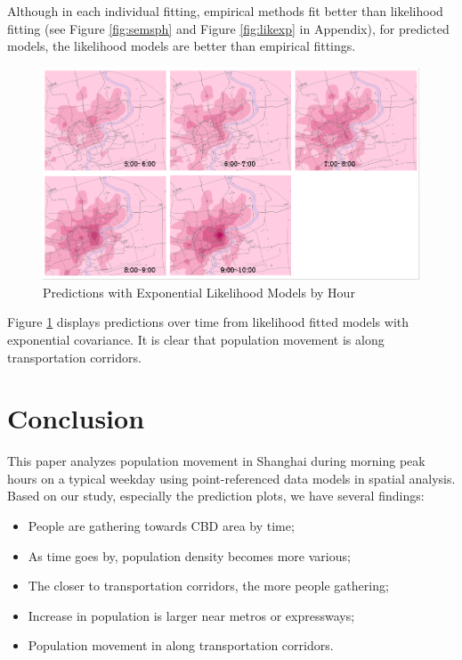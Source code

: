 \documentclass[hidelinks,12pt]{article}
\begin{document}
	 Although in each individual fitting, empirical methods fit better than likelihood fitting (see Figure \ref{fig:semsph} and Figure \ref{fig:likexp} in Appendix), for predicted models, the likelihood models are better than empirical fittings.
	 \begin{figure}[!ht]
	 	\includegraphics[width=\textwidth]{pred_exp.png}
	 	\caption{Predictions with Exponential Likelihood Models by Hour \label{fig:predexp}}
	 \end{figure}
 
	 Figure \ref{fig:predexp} displays predictions over time from likelihood fitted models with exponential covariance. It is clear that population movement is along transportation corridors.

	\section{Conclusion}\label{sec:con}
	This paper analyzes population movement in Shanghai during morning peak hours on a typical weekday using point-referenced data models in spatial analysis. Based on our study, especially the prediction plots, we have several findings:
	\begin{itemize}
		\item People are gathering towards CBD area by time;
		\item As time goes by, population density becomes more various;
		\item The closer to transportation corridors, the more people gathering;
		\item Increase in population is larger near metros or expressways;
		\item Population movement in along transportation corridors.
	\end{itemize}
\end{document}
